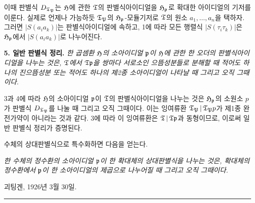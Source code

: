 이때 판별식 \(D_{\mathfrak{T}_\mathfrak P}\)는 \(\mathfrak H\)에 관한 \(\mathfrak{T}\)의 판별식아이디얼을 \(\mathfrak H_\mathfrak p\)로 확대한 아이디얼의 기저를 이룬다. 실제로 언제나 가능하듯 \(\mathfrak{T}_\mathfrak P\)의 \(\mathfrak H_\mathfrak p\)-모듈기저로 \(\mathfrak{T}\)의 원소 \(a_1,\ldots,a_n\)을 택하자. 그러면 \(|S(a_i a_k)|\)는 판별식아이디얼에 속하고, 1에 따라 모든 행렬식 \(|S(\tau_i\tau_k)|\)은 \(\mathfrak H_\mathfrak p\)에서 \(|S(a_i a_k)|\)로 나누어진다.

\textbf{5. 일반 판별식 정리.} \emph{한 곱셈환 \(\mathfrak H\)의 소아이디얼 \(\mathfrak p\)이 \(\mathfrak H\)에 관한 한 오더의 판별식아이디얼을 나누는 것은, \(\mathfrak{T}\)에서 \(\mathfrak{T}\mathfrak p\)을 쌍마다 서로소인 으뜸성분들로 분해할 때 적어도 하나의 진으뜸성분 또는 적어도 하나의 제2종 소아이디얼이 나타날 때 그리고 오직 그때이다.}

3과 4에 따라 \(\mathfrak H\)의 소아이디얼 \(\mathfrak p\)이 \(\mathfrak{T}\)의 판별식아이디얼을 나누는 것은 \(\mathfrak H_\mathfrak p\)의 소원소 \(p\)가 판별식 \(D_{\mathfrak{T}_\mathfrak P}\)를 나눌 때 그리고 오직 그때이다. 이는 잉여류환 \(\mathfrak{T}_\mathfrak P\,|\,\mathfrak{T}_\mathfrak P p\)가 제1종 완전가약이 아니라는 것과 같다. 3에 따라 이 잉여류환은 \(\mathfrak{T}\,|\,\mathfrak{T}\mathfrak p\)과 동형이므로, 이로써 일반 판별식 정리가 증명된다.

수체의 상대판별식으로 특수화하면 다음을 얻는다.

\emph{한 수체의 정수환의 소아이디얼 \(\mathfrak p\)이 한 확대체의 상대판별식을 나누는 것은, 확대체의 정수환에서 \(\mathfrak p\)이 한 소아이디얼의 제곱으로 나누어질 때 그리고 오직 그때이다.}

괴팅겐, 1926년 3월 30일.

\begin{center}
\rule{9em}{0.4pt}
\end{center}
